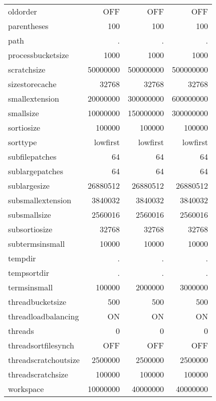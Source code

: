 \begin{center}
\begin{tabular}{lrrr}
oldorder &              OFF           & OFF         & OFF          \\
parentheses &           100           & 100         & 100          \\
path &                  .             & .           & .            \\
processbucketsize &     1000          & 1000        & 1000         \\
scratchsize &           50000000      & 500000000   & 500000000    \\
sizestorecache &        32768         & 32768       & 32768        \\
smallextension &        20000000      & 300000000   & 600000000    \\
smallsize &             10000000      & 150000000   & 300000000    \\
sortiosize &            100000        & 100000      & 100000       \\
sorttype &              lowfirst      & lowfirst    & lowfirst     \\
subfilepatches &        64            & 64          & 64           \\
sublargepatches &       64            & 64          & 64           \\
sublargesize &          26880512      & 26880512    & 26880512     \\
subsmallextension &     3840032       & 3840032     & 3840032      \\
subsmallsize &          2560016       & 2560016     & 2560016      \\
subsortiosize &         32768         & 32768       & 32768        \\
subtermsinsmall &       10000         & 10000       & 10000        \\
tempdir &               .             & .           & .            \\
tempsortdir &           .             & .           & .            \\
termsinsmall &          100000        & 2000000     & 3000000      \\
threadbucketsize &      500           & 500         & 500          \\
threadloadbalancing &   ON            & ON          & ON           \\
threads &               0             & 0           & 0            \\
threadsortfilesynch &   OFF           & OFF         & OFF          \\
threadscratchoutsize &  2500000       & 2500000     & 2500000      \\
threadscratchsize &     100000        & 100000      & 100000       \\
workspace &             10000000      & 40000000    & 40000000    
\end{tabular}
\end{center}

